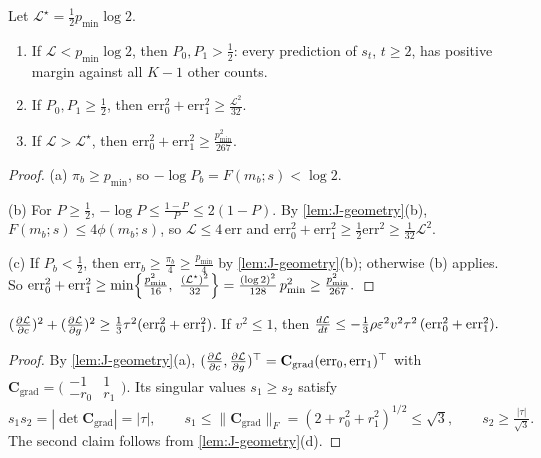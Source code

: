 \begin{lemma}
\label{lem:J-levels}
Let $\mathcal L^\star=\frac{1}{2}p_{\min}\log2$.
\begin{enumerate}[label=(\alph*),leftmargin=*,itemsep=2pt,topsep=3pt]
\item If $\mathcal L<p_{\min}\log2$, then $P_0,P_1>\frac{1}{2}$: every prediction of $s_t$, $t\ge2$, has positive margin against all $K-1$ other counts.
\item If $P_0,P_1\ge\frac{1}{2}$, then $\mathrm{err}_0^2+\mathrm{err}_1^2\ge \frac{\mathcal L^2}{32}$.
\item If $\mathcal L>\mathcal L^\star$, then $\mathrm{err}_0^2+\mathrm{err}_1^2\ge \frac{p_{\min}^2}{267}$.
\end{enumerate}
\end{lemma}

\begin{proof}
(a) $\pi_b\ge p_{\min}$, so $-\log P_b=F(m_b;s)<\log2$.

(b) For $P\ge\frac{1}{2}$, $-\log P\le\frac{1-P}{P}\le2(1-P)$. By \cref{lem:J-geometry}(b), $F(m_b;s)\le4\phi(m_b;s)$, so $\mathcal L\le4\,\mathrm{err}$ and
$\mathrm{err}_0^2+\mathrm{err}_1^2\ge\frac{1}{2}\mathrm{err}^2\ge\frac{1}{32}\mathcal L^2$.

(c) If $P_b<\frac{1}{2}$, then $\mathrm{err}_b\ge\frac{\pi_b}{4}\ge\frac{p_{\min}}{4}$ by \cref{lem:J-geometry}(b); otherwise (b) applies. So
 $\mathrm{err}_0^2+\mathrm{err}_1^2\ge\min\Bigl\{\frac{p_{\min}^2}{16},\ \frac{(\mathcal L^\star)^2}{32}\Bigr\}=\frac{(\log2)^2}{128}\,p_{\min}^2\ge\frac{p_{\min}^2}{267}. \qedhere$ 
\end{proof}

\begin{lemma}
\label{lem:J-gradient}
$(\pd{\mathcal L}{c})^2+(\pd{\mathcal L}{g})^2\ge\frac{1}{3}\tau^2(\mathrm{err}_0^2+\mathrm{err}_1^2)$. If $v^2\le1$, then
 $\ddt{\mathcal L}\le-\tfrac{1}{3}\rho\initscale^2v^2\tau^2\,(\mathrm{err}_0^2+\mathrm{err}_1^2).$ 
\end{lemma}

\begin{proof}
By \cref{lem:J-geometry}(a), $(\pd{\mathcal L}{c},\pd{\mathcal L}{g})^\top=\mathbf C_{\mathrm{grad}}(\mathrm{err}_0,\mathrm{err}_1)^\top$ with $\mathbf C_{\mathrm{grad}}=\bigl(\begin{smallmatrix}-1&1\\-r_0&r_1\end{smallmatrix}\bigr)$. Its singular values $s_1\ge s_2$
satisfy
 $s_1s_2=|\det\mathbf C_{\mathrm{grad}}|=|\tau|,\qquad s_1\le\|\mathbf C_{\mathrm{grad}}\|_F=(2+r_0^2+r_1^2)^{1/2}\le\sqrt3,\qquad s_2\ge\frac{|\tau|}{\sqrt3} .$ 
The second claim follows from \cref{lem:J-geometry}(d).
\end{proof}

